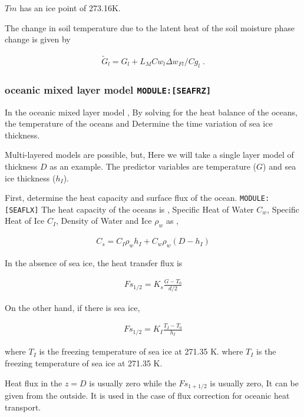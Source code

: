 \(Tm\) has an ice point of 273.16K.

The change in soil temperature due to the latent heat of the soil
moisture phase change is given by

\begin{eqnarray}
  \tilde{G}_l = G_l + L_M Cw_l \Delta w_{Fl} / Cg_l \; .
\end{eqnarray}

\hypertarget{oceanic-mixed-layer-model-moduleseafrz}{%
\subsubsection{\texorpdfstring{oceanic mixed layer model
\texttt{MODULE:{[}SEAFRZ{]}}}{oceanic mixed layer model MODULE:{[}SEAFRZ{]}}}\label{oceanic-mixed-layer-model-moduleseafrz}}

In the oceanic mixed layer model , By solving for the heat balance of
the oceans, the temperature of the oceans and Determine the time
variation of sea ice thickness.

Multi-layered models are possible, but, Here we will take a single layer
model of thickness \(D\) as an example. The predictor variables are
temperature (\(G\)) and sea ice thickness (\(h_I\)).

First, determine the heat capacity and surface flux of the ocean.
\texttt{MODULE:{[}SEAFLX{]}} The heat capacity of the oceans is ,
Specific Heat of Water \(C_w\), Specific Heat of Ice \(C_I\), Density of
Water and Ice \(\rho_w\) as ,

\begin{eqnarray}
  C_s  = C_I \rho_w h_I +   C_w \rho_w (D - h_I)
\end{eqnarray}

In the absence of sea ice, the heat transfer flux is

\begin{eqnarray}
  Fs_{1/2} = K_s \frac{ G - T_0 }{d/2}
\end{eqnarray}

On the other hand, if there is sea ice,

\begin{eqnarray}
 Fs_{1/2} = K_I \frac{ T_I - T_0 }{h_I}
\end{eqnarray}

where \(T_I\) is the freezing temperature of sea ice at 271.35 K. where
\(T_I\) is the freezing temperature of sea ice at 271.35 K.

Heat flux in the \(z=D\) is usually zero while the \(Fs_{1+1/2}\) is
usually zero, It can be given from the outside. It is used in the case
of flux correction for oceanic heat transport.

